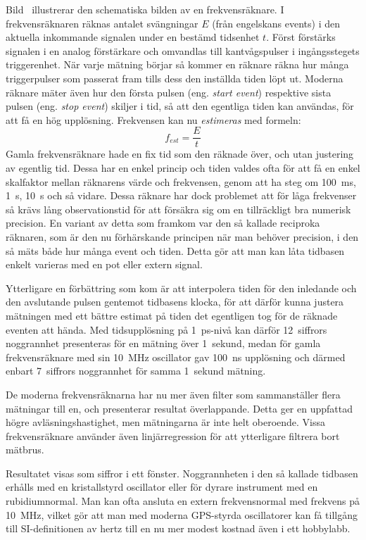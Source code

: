 Bild~ illustrerar den schematiska bilden av en
frekvensräknare.
I frekvensräknaren räknas antalet svängningar \(E\) (från engelskans events)
i den aktuella inkommande signalen under en bestämd tidsenhet \(t\).
Först förstärks signalen i en analog förstärkare och omvandlas till
kantvågspulser i ingångsstegets triggerenhet.
När varje mätning börjar så kommer en räknare räkna hur många triggerpulser
som passerat fram tills dess den inställda tiden löpt ut.
Moderna räknare mäter även hur den första pulsen (eng. \emph{start event})
respektive sista pulsen (eng. \emph{stop event}) skiljer i tid, så att den
egentliga tiden kan användas, för att få en hög upplösning.
Frekvensen kan nu \emph{estimeras} med formeln:
\[f_{est} = \dfrac{E}{t}\]
Gamla frekvensräknare hade en fix tid som den räknade över, och utan justering
av egentlig tid.
Dessa har en enkel princip och tiden valdes ofta för att få en enkel skalfaktor
mellan räknarens värde och frekvensen, genom att ha steg om
\qty{100}{\milli\second}, \qty{1}{\second}, \qty{10}{\second} och så vidare.
Dessa räknare har dock problemet att för låga frekvenser så krävs lång
observationstid för att försäkra sig om en tillräckligt bra numerisk precision.
En variant av detta som framkom var den så kallade reciproka räknaren, som är
den nu förhärskande principen när man behöver precision, i den så mäts både
hur många event och tiden.
Detta gör att man kan låta tidbasen enkelt varieras med en pot eller extern
signal.

Ytterligare en förbättring som kom är att interpolera tiden för den inledande
och den avslutande pulsen gentemot tidbasens klocka, för att därför kunna
justera mätningen med ett bättre estimat på tiden det egentligen tog för de
räknade eventen att hända.
Med tidsupplösning på 1~ps-nivå kan därför 12~siffrors noggrannhet presenteras
för en mätning över 1~sekund, medan för gamla frekvensräknare med sin
\qty{10}{\mega\hertz} oscillator gav \qty{100}{\nano\second} upplösning och
därmed enbart 7~siffrors noggrannhet för samma 1~sekund mätning.

De moderna frekvensräknarna har nu mer även filter som sammanställer flera
mätningar till en, och presenterar resultat överlappande.
Detta ger en uppfattad högre avläsningshastighet, men mätningarna är inte helt
oberoende.
Vissa frekvensräknare använder även linjärregression för att ytterligare
filtrera bort mätbrus.

Resultatet visas som siffror i ett fönster.
Noggrannheten i den så kallade tidbasen erhålls med en kristallstyrd oscillator
eller för dyrare instrument med en rubidiumnormal.
Man kan ofta ansluta en extern frekvensnormal med frekvens på \qty{10}{\mega\hertz},
vilket gör att man med moderna GPS-styrda oscillatorer kan få tillgång till
SI-definitionen av hertz till en nu mer modest kostnad även i ett hobbylabb.

